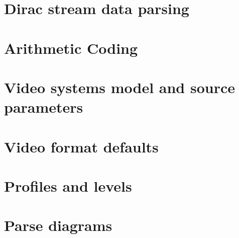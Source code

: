 




\appendix
\section{Dirac stream data parsing}

\clearpage
\section{Arithmetic Coding}

\clearpage
\section{Video systems model and source parameters}


\clearpage
\section{Video format defaults}

\clearpage
\section{Profiles and levels}

\clearpage
\section{Parse diagrams}

